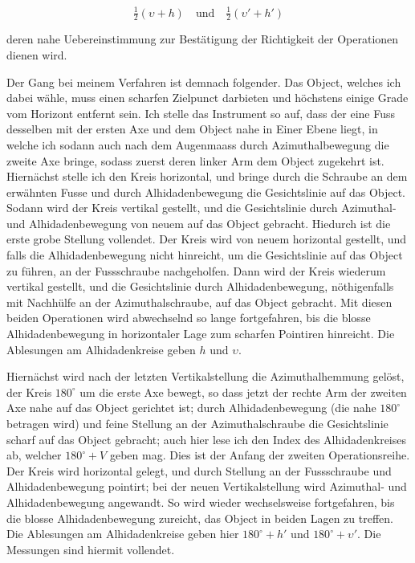 \[ \tfrac{1}{2}(\upsilon+h) \quad\text{und}\quad \tfrac{1}{2}(\upsilon'+h') \]

\noindent deren nahe Uebereinstimmung zur Bestätigung der Richtigkeit der Operationen dienen wird.

\par\indent Der Gang bei meinem Verfahren ist demnach folgender. Das Object, welches ich dabei wähle, muss einen scharfen Zielpunct darbieten und höchstens einige Grade vom Horizont entfernt sein. Ich stelle das Instrument so auf, dass der eine Fuss desselben mit der ersten Axe und dem Object nahe in Einer Ebene liegt, in welche ich sodann auch nach dem Augenmaass durch Azimuthalbewegung die zweite Axe bringe, sodass zuerst deren linker Arm dem Object zugekehrt ist. Hiernächst stelle ich den Kreis horizontal, und bringe durch die Schraube an dem erwähnten Fusse und durch Alhidadenbewegung die Gesichtslinie auf das Object. Sodann wird der Kreis vertikal gestellt, und die Gesichtslinie durch Azimuthal- und Alhidadenbewegung von neuem auf das Object gebracht. Hiedurch ist die erste grobe Stellung vollendet. Der Kreis wird von neuem horizontal gestellt, und falls die Alhidadenbewegung nicht hinreicht, um die Gesichtslinie auf das Object zu führen, an der Fussschraube nachgeholfen. Dann wird der Kreis wiederum vertikal gestellt, und die Gesichtslinie durch Alhidadenbewegung, nöthigenfalls mit Nachhülfe an der Azimuthalschraube, auf das Object gebracht. Mit diesen beiden Operationen wird abwechselnd so lange fortgefahren, bis die blosse Alhidadenbewegung in horizontaler Lage zum scharfen Pointiren hinreicht. Die Ablesungen am Alhidadenkreise geben $h$ und $\upsilon$.

\par\indent Hiernächst wird nach der letzten Vertikalstellung die Azimuthalhemmung gelöst, der Kreis $180^\circ$ um die erste Axe bewegt, so dass jetzt der rechte Arm der zweiten Axe nahe auf das Object gerichtet ist; durch Alhidadenbewegung (die nahe $180^\circ$ betragen wird) und feine Stellung an der Azimuthalschraube die Gesichtslinie scharf auf das Object gebracht; auch hier lese ich den Index des Alhidadenkreises ab, welcher $180^\circ+V$ geben mag. Dies ist der Anfang der zweiten Operationsreihe. Der Kreis wird horizontal gelegt, und durch Stellung an der Fussschraube und Alhidadenbewegung pointirt; bei der neuen Vertikalstellung wird Azimuthal- und Alhidadenbewegung angewandt. So wird wieder wechselsweise fortgefahren, bis die blosse Alhidadenbewegung zureicht, das Object in beiden Lagen zu treffen. Die Ablesungen am Alhidadenkreise geben hier $180^\circ+h'$ und $180^\circ+\upsilon'$. Die Messungen sind hiermit vollendet.

